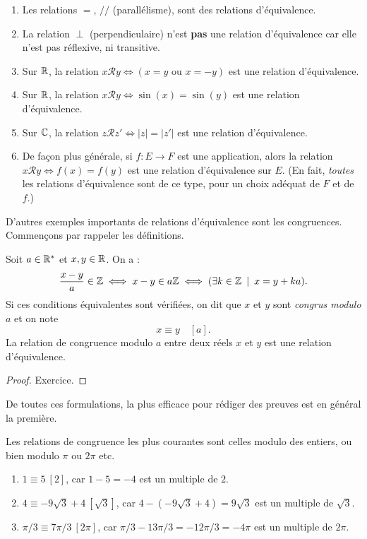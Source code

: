 \begin{exemples}
\begin{enumerate}[label=\alph*)]
\item Les relations $=$, $//$ (parallélisme), sont des relations d'équivalence.
\item La relation $\perp$ (perpendiculaire) n'est \textbf{pas} une relation d'équivalence car elle n'est pas réflexive, ni transitive.
\item Sur $\mathbb{R}$, la relation $x\mathcal R y \iff \left(x=y\text{ ou }x=-y\right)$ est une relation d'équivalence.
\item Sur $\mathbb{R}$, la relation $x\mathcal R y \iff \sin(x)=\sin(y)$ est une relation d'équivalence.
\item Sur $\mathbb{C}$, la relation $z\mathcal R z' \iff |z|=|z'|$ est une relation d'équivalence.
\item De façon plus générale, si $f : E\to F$ est une application, alors la relation $x\mathcal R y \iff f(x)=f(y)$ est une relation d'équivalence sur $E$.
(En fait, \emph{toutes} les relations d'équivalence sont de ce type, pour un choix adéquat de $F$ et de $f$.)
\end{enumerate}
\end{exemples}

D'autres exemples importants de relations d'équivalence sont les congruences. Commençons par rappeler les définitions.

\begin{propdef}
Soit $a\in \mathbb{R}^*$ et $x,y\in\mathbb{R}$. On a :
\[
\frac{x-y}{a}\in \mathbb{Z} 
\iff
x-y \in a\mathbb{Z}
\iff 
(\exists k\in \mathbb{Z}\:\mid\: x=y+ka).
\]
Si ces conditions équivalentes sont vérifiées, on dit que $x$ et $y$ sont \emph{congrus modulo $a$} et on note 
\[ x\equiv y\quad [a].\]
La relation de congruence modulo $a$ entre deux réels $x$ et $y$ est une relation d'équivalence.
\end{propdef}
\begin{proof}
Exercice.
\end{proof}

De toutes ces formulations, la plus efficace pour rédiger des preuves est en général la première.

Les relations de congruence les plus courantes sont celles modulo des entiers, ou bien modulo $\pi$ ou $2\pi$ etc.


\begin{exemples}
\begin{enumerate}[label=\alph*)]
\item $1 \equiv 5 \: [2]$, car $1-5 = -4$ est un multiple de $2$.
\item $4\equiv -9\sqrt{3}+4 \: [\sqrt{3}]$, car $4 - (-9\sqrt{3}+4) = 9\sqrt{3}$ est un multiple de $\sqrt{3}$.
\item $\pi/3 \equiv 7\pi/3 \: [2\pi]$, car $\pi/3 - 13\pi/3 = -12\pi/3 = -4\pi$ est un multiple de $2\pi$.
\end{enumerate}
\end{exemples}

